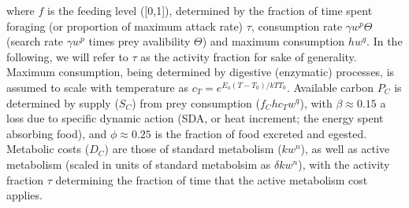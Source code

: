\documentclass{article}
\begin{document}
where $f$ is the feeding level ([0,1]), determined by the fraction of time spent foraging (or proportion of maximum attack rate) $\tau$, consumption rate $\gamma w^p \Theta$ (search rate $\gamma w^p$ times prey avalibility $\Theta$) and maximum consumption $h w^q$. In the following, we will refer to $\tau$ as the activity fraction for sake of generality. Maximum consumption, being determined by digestive (enzymatic) processes, is assumed to scale with temperature as $c_T = e^{E_a(T-T_0)/kTT_0}$. Available carbon $P_C$ is determined by supply ($S_C$) from prey consumption ($f_C h c_T w^q$), with $\beta \approx 0.15$ a loss due to specific dynamic action (SDA, or heat increment; the energy spent absorbing food), and $\phi \approx 0.25$ is the fraction of food excreted and egested. Metabolic costs ($D_C$) are those of standard metabolism ($k w^n$), as well as active metabolism (scaled in units of standard metabolsim as $\delta k w^n$), with the activity fraction $\tau$ determining the fraction of time that the active metabolism cost applies.
\end{document}

